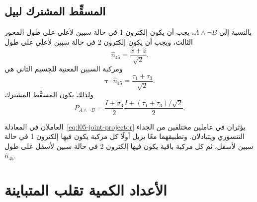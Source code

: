 \subsection{المسقِّط المشترك لبيل}

بالنسبة إلى \(A\wedge\neg B\)، يجب أن يكون إلكترون 1 في حالة سبين لأعلى على طول المحور الثالث، ويجب أن يكون إلكترون 2 في حالة سبين لأعلى على طول
\begin{equation}
  \hat n_{45}=\frac{\hat x+\hat z}{\sqrt2}.
\end{equation}
ومركبة السبين المعنية للجسيم الثاني هي
\begin{equation}
  \boldsymbol{\tau}\cdot\hat n_{45}
  =
  \frac{\tau_1+\tau_3}{\sqrt2}.
\end{equation}
ولذلك يكون المسقِّط المشترك
\begin{equation}
  P_{A\wedge\neg B}
  =
  \frac{I+\sigma_3}{2}
  \frac{I+(\tau_1+\tau_3)/\sqrt2}{2}.
  \label{eq:l05-joint-projector}
\end{equation}

\begin{classroomqa}
\end{classroomqa}

\begin{classroomqa}
\end{classroomqa}

العاملان في المعادلة~\eqref{eq:l05-joint-projector} يؤثران في عاملين مختلفين من الجداء التنسوري ويتبادلان. وتطبيقهما معًا يزيل أولًا كل مركبة يكون فيها إلكترون 1 في حالة سبين لأسفل، ثم كل مركبة باقية يكون فيها إلكترون 2 في حالة سبين لأسفل على طول \(\hat n_{45}\).

\section{الأعداد الكمية تقلب المتباينة}

